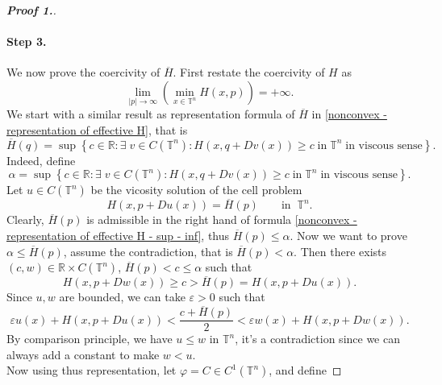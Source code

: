 \documentclass[12pt, oneside]{amsart}  	%
\begin{document}
\begin{proof}[\textbf{Proof 1.}]
\paragraph{\textbf{Step 3.}} We now prove the coercivity of $\overline{H}$. First restate the coercivity of $H$ as
\begin{equation}\label{rewrite the uniformly in x coercivity of H}
\lim_{|p|\longrightarrow\infty} \left( \min_{x\in \mathbb{T}^n} H(x,p)\right) = +\infty.
\end{equation}
We start with a similar result as representation formula of $\overline{H}$ in \eqref{nonconvex - representation of effective H}, that is
\begin{equation}\label{nonconvex - representation of effective H - sup - inf}
\overline{H}(q) = \sup \left\lbrace c\in \mathbb{R}: \exists\;v\in C(\mathbb{T}^n): H(x,q+Dv(x))\geq c\;\text{in}\;\mathbb{T}^n\;\text{in viscous sense}\right\rbrace .
\end{equation}
Indeed, define 
\begin{equation*}
\alpha = \sup \left\lbrace c\in \mathbb{R}: \exists\;v\in C(\mathbb{T}^n): H(x,q+Dv(x))\geq c\;\text{in}\;\mathbb{T}^n\;\text{in viscous sense}\right\rbrace .
\end{equation*}
Let $u\in C(\mathbb{T}^n)$ be the vicosity solution of the cell problem
\begin{equation*}
H(x,p+Du(x)) = \overline{H}(p) \qquad\text{in}\;\;\mathbb{T}^n.
\end{equation*}
Clearly, $\overline{H}(p)$ is admissible in the right hand of formula \eqref{nonconvex - representation of effective H - sup - inf}, thus $\overline{H}(p) \leq \alpha$. Now we want to prove $\alpha \leq \overline{H}(p)$, assume the contradiction, that is $\overline{H}(p) < \alpha$. Then there exists $(c,w)\in \mathbb{R}\times C(\mathbb{T}^n)$, $\overline{H}(p) < c \leq \alpha$ such that
\begin{equation*}
H(x,p+Dw(x)) \geq c >\overline{H}(p) = H(x,p+Du(x)).
\end{equation*}
Since $u,w$ are bounded, we can take $\varepsilon>0$ such that
\begin{equation*}
\varepsilon u(x) +H(x,p+Du(x)) < \frac{c+\overline{H}(p)}{2} < \varepsilon w(x) + H(x,p+Dw(x)).
\end{equation*}
By comparison principle, we have $u\leq w$ in $\mathbb{T}^n$, it's  a contradiction since we can always add a constant to make $w<u$.\\
Now using thus representation, let $\varphi = C\in  C^1(\mathbb{T}^n)$, and define 

\end{proof}
\end{document}
